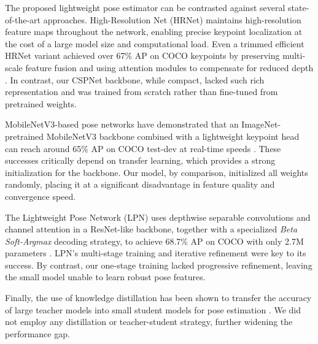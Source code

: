 The proposed lightweight pose estimator can be contrasted against several state-of-the-art approaches. High-Resolution Net (HRNet) maintains high-resolution feature maps throughout the network, enabling precise keypoint localization at the cost of a large model size and computational load. Even a trimmed efficient HRNet variant achieved over 67\% AP on COCO keypoints by preserving multi-scale feature fusion and using attention modules to compensate for reduced depth \cite{Sun_2019_CVPR}. In contrast, our CSPNet backbone, while compact, lacked such rich representation and was trained from scratch rather than fine-tuned from pretrained weights.

MobileNetV3-based pose networks have demonstrated that an ImageNet-pretrained MobileNetV3 backbone combined with a lightweight keypoint head can reach around 65\% AP on COCO test-dev at real-time speeds \cite{Howard2017}. These successes critically depend on transfer learning, which provides a strong initialization for the backbone. Our model, by comparison, initialized all weights randomly, placing it at a significant disadvantage in feature quality and convergence speed.

The Lightweight Pose Network (LPN) uses depthwise separable convolutions and channel attention in a ResNet-like backbone, together with a specialized \emph{Beta Soft-Argmax} decoding strategy, to achieve 68.7\% AP on COCO with only 2.7M parameters \cite{Zhang2020LPN}. LPN’s multi-stage training and iterative refinement were key to its success. By contrast, our one-stage training lacked progressive refinement, leaving the small model unable to learn robust pose features.

Finally, the use of knowledge distillation has been shown to transfer the accuracy of large teacher models into small student models for pose estimation \cite{Li2021OKD}. We did not employ any distillation or teacher-student strategy, further widening the performance gap.
